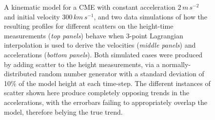 \documentclass[structabstract]{aa}
\begin{document}
\begin{figure}[!t]
\caption{A kinematic model for a CME with constant acceleration $2\,m\,s^{-2}$ and initial velocity $300\,km\,s^{-1}$, and two data simulations of how the resulting profiles for different scatters on the height-time measurements (\emph{top panels}) behave when 3-point Lagrangian interpolation is used to derive the velocities (\emph{middle panels}) and accelerations (\emph{bottom panels}). Both simulated cases were produced by adding scatter to the height measurements, via a normally-distributed random number generator with a standard deviation of 10\% of the model height at each time-step. The different instances of scatter shown here produce completely opposing trends in the accelerations, with the errorbars failing to appropriately overlap the model, therefore belying the true trend.}
\label{sim_vels_thesis}
\end{figure}
\end{document}

